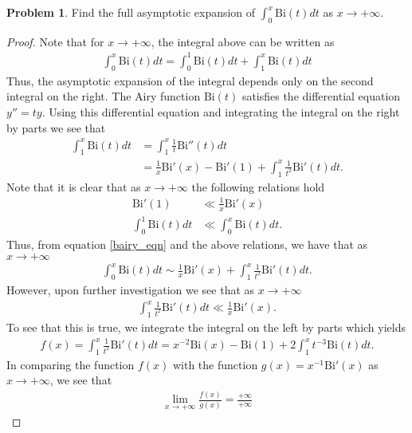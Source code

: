 \documentclass[12pt]{article}
\theoremstyle{definition}
\newtheorem{problem}{Problem}
\newcommand{\bairy}{\text{Bi}}
\begin{document}
\begin{problem}
  Find the full asymptotic expansion of $\int_0^x \bairy(t) dt$ as $x \to +\infty$.
\end{problem}

\begin{proof}
  Note that for $x\to + \infty$, the integral above can be written as
  \begin{align}\label{bairy_eqn}
    \int_0^x \bairy(t) dt = \int_0^1 \bairy(t) dt + \int_1^x \bairy(t) dt
  \end{align}
  Thus, the asymptotic expansion of the integral depends only on the second integral on the right.
  The Airy function $\bairy(t)$ satisfies the differential equation $y'' = ty$. Using this differential equation and integrating
  the integral on the right by parts we see that
  \begin{align*}
    \int_1^x \bairy(t) dt &= \int_1^x \frac{1}{t}\bairy''(t) dt \\
    &= \frac{1}{x}\bairy'(x) - \bairy'(1) + \int_1^x \frac{1}{t^2} \bairy'(t) dt.
  \end{align*}
  Note that it is clear that as $x\to + \infty$ the following relations hold
  \begin{align*}
    \bairy'(1) &\ll \frac{1}{x}\bairy'(x)\\
    \int_0^1 \bairy(t)dt &\ll \int_0^x \bairy(t)dt.
  \end{align*}
  Thus, from equation \eqref{bairy_eqn} and the above relations, we have that as $x\to + \infty$
  \begin{align}\label{double_asym}
    \int_0^x \bairy(t) dt \sim \frac{1}{x}\bairy'(x) + \int_1^x \frac{1}{t^2} \bairy'(t) dt.
  \end{align}
  However, upon further investigation we see that as $x \to +\infty$
  \begin{align}\label{lhosp}
    \int_1^x \frac{1}{t^2} \bairy'(t) dt \ll \frac{1}{x}\bairy'(x).
  \end{align}
  To see that this is true, we integrate the integral on the left by parts which yields
  \begin{align*}
    f(x) = \int_1^x \frac{1}{t^2} \bairy'(t) dt = x^{-2}\bairy(x) - \bairy(1) + 2\int_{1}^x t^{-3}\bairy(t)dt.
  \end{align*}
  In comparing the function $f(x)$ with the function $g(x) = x^{-1}\bairy'(x)$ as $x \to +\infty$, we see that
  \begin{align*}
    \lim_{x\to+\infty} \frac{f(x)}{g(x)} = \frac{+\infty}{+\infty}

\end{align*}
\end{proof}
\end{document}
